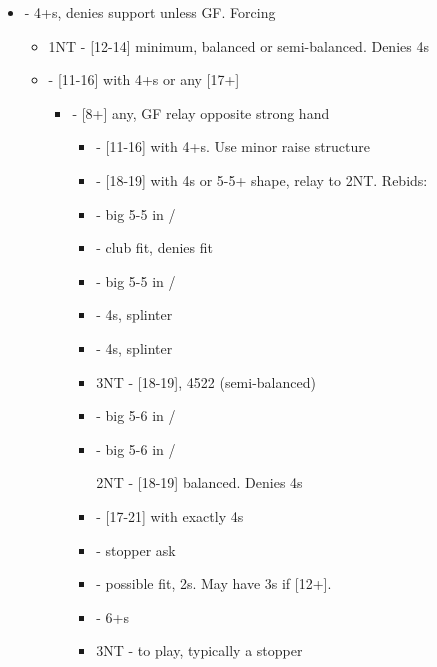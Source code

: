 \documentclass[12pt]{report}
\newcommand{\ul}[1]{\begin{itemize}#1\end{itemize}}
\newcommand{\li}{\item[~]}
\begin{document}
    \ul {
        \li {} - 4+\sp{}s, denies \he{} support unless GF.  Forcing
        \ul {
            \li 1NT - [12-14] minimum, balanced or semi-balanced.  Denies 4\sp{}s
            \li \cl2 - [11-16] with 4+\cl{}s or any [17+]
            \ul {
                \li \di2 - [8+] any, GF relay opposite strong hand
                \ul {
                    \li \he2 - [11-16] with 4+\cl{}s.  Use minor raise structure
                    \li \sp2 - [18-19] with 4\sp{}s or 5-5+ shape, relay to 2NT.  Rebids:
                        \li \qquad \cl3 - big 5-5 in \he{}/\cl{}
                            \li \qquad \qquad \di3 - club fit, denies \he{} fit
                        \li \qquad \di3 - big 5-5 in \he{}/\di{}
                        \li \qquad \he3 - 4\sp{}s, \cl{} splinter
                        \li \qquad \sp3 - 4\sp{}s, \di{} splinter
                        \li \qquad 3NT - [18-19], 4522 (semi-balanced)
                        \li \qquad \cl4 - big 5-6 in \he{}/\cl{}
                        \li \qquad \di4 - big 5-6 in \he{}/\di{}
                    
                    2NT - [18-19] balanced.  Denies 4\sp{}s
                    \li \cl3 - [17-21] with exactly 4\cl{}s
                        \li \qquad \di3 - stopper ask
                        \li \qquad \he3 - possible fit, 2\he{}s.  May have 3\he{}s if [12+].
                        \li \qquad \sp3 - 6+\sp{}s
                        \li \qquad 3NT - to play, typically a stopper

}}}}
\end{document}
